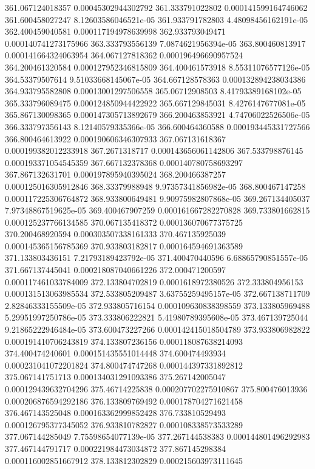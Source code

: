 {361.067124018357 0.00045302944302792
361.333791022802 0.000141599164746062
361.600458027247 8.12603586046521e-05
361.933791782803 4.48098456162191e-05
362.400459040581 0.000117194978639998
362.933793049471 0.000140741273175966
363.333793556139 7.0874621956394e-05
363.800460813917 0.000141664324063954
364.067127818362 0.000196496690957524
364.200461320584 0.000127952346815809
364.400461573918 8.55311076577126e-05
364.53379507614 9.51033668145067e-05
364.667128578363 0.000132894238034386
364.933795582808 0.00013001297506558
365.06712908503 8.41793389168102e-05
365.333796089475 0.000124850944422922
365.667129845031 8.4276147677081e-05
365.867130098365 0.000147305713892679
366.200463853921 4.74706022526506e-05
366.333797356143 8.12140579335366e-05
366.600464360588 0.000193445331727566
366.800464613922 0.000190606346307933
367.067131618367 0.000199382012233918
367.2671318717 0.000143656061142806
367.533798876145 0.000193371054545359
367.667132378368 0.000140780758693297
367.867132631701 0.000197895940395024
368.200466387257 0.000125016305912846
368.33379988948 9.97357341856982e-05
368.800467147258 0.000117225306764872
368.933800649481 9.90975982807868e-05
369.267134405037 7.97348867519625e-05
369.400467907259 0.000161667282270828
369.733801662815 0.000125237766134585
370.067135418372 0.000136070677375725
370.200468920594 0.000303507338161333
370.467135925039 0.000145365156785369
370.933803182817 0.000164594691363589
371.133803436151 7.21793189423792e-05
371.400470440596 6.68865790851557e-05
371.667137445041 0.000218087040661226
372.000471200597 0.000117461033784009
372.133804702819 0.0001618972380526
372.333804956153 0.000131513063985534
372.533805209487 3.63755259495157e-05
372.667138711709 2.82846333155509e-05
372.933805716154 0.000109630838398559
373.133805969488 5.29951997250786e-05
373.333806222821 5.41980789395608e-05
373.467139725044 9.21865222946484e-05
373.600473227266 0.000142415018504789
373.933806982822 0.000191410706243819
374.133807236156 0.000118087638214093
374.400474240601 0.000151435551014448
374.600474493934 0.000231041072201824
374.800474747268 0.000144397331892812
375.067141751713 0.000134031291093386
375.267142005047 0.000129439632704296
375.46714225838 0.000207702275910867
375.800476013936 0.000206876594292186
376.133809769492 0.000178704271621458
376.467143525048 0.000163362999852428
376.733810529493 0.000126795377345052
376.933810782827 0.000108338573533289
377.067144285049 7.75598654077139e-05
377.267144538383 0.000144801496292983
377.467144791717 0.000221984473034872
377.867145298384 0.000116002851667912
378.133812302829 0.000215603973111645
}
